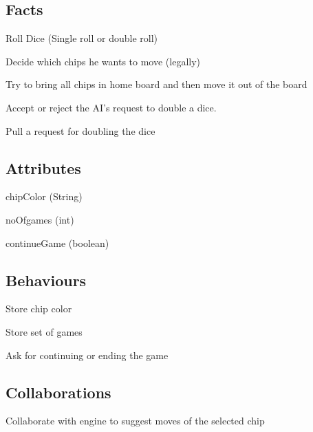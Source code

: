\documentclass{report}
\begin{document}
\subsection{Facts}

\begin{dashed}
    \item Roll Dice (Single roll or double roll)
    \item Decide which chips he wants to move (legally)
    \item Try to bring all chips in home board and then move it out of the board
    \item Accept or reject the AI's request to double a dice.
    \item Pull a request for doubling the dice
\end{dashed}

\subsection{Attributes}

    \begin{dashed}
        \item chipColor (String)
        \item noOfgames (int)
        \item continueGame (boolean)
    \end{dashed}

\subsection{Behaviours}

    \begin{dashed}
        \item Store chip color
        \item Store set of games
        \item Ask for continuing or ending the game
    \end{dashed}

\subsection{Collaborations}

    \begin{dashed}
        \item Collaborate with engine to suggest moves of the selected chip
    \end{dashed}
\end{document}
